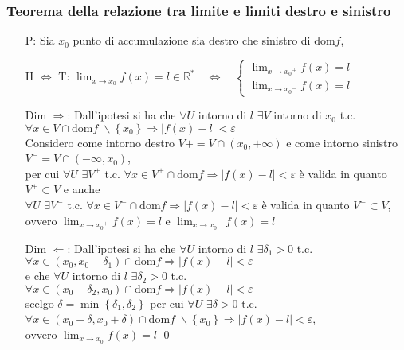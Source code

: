 \documentclass[a4paper]{article}
\newcommand\dom{\text{dom}}
\begin{document}
\subsubsection*{Teorema della relazione tra limite e limiti destro e sinistro}
\begin{itemize}
	\item[P:] Sia \(x_0\) punto di accumulazione sia destro che sinistro di \(\dom f\),
	\item[H \(\Leftrightarrow\) T:] \(\displaystyle \lim_{x \to x_0} f(x) = l \in \mathbb{R}^* \quad \Leftrightarrow \quad
	\begin{cases}
		\displaystyle \lim_{x \to {x_0}^+} f(x) = l \\
		\displaystyle \lim_{x \to {x_0}^-} f(x) = l
	\end{cases}
	\)

	\item[Dim \(\Rightarrow\):] Dall'ipotesi si ha che \(\forall U\) intorno di \(l\) \(\exists V\) intorno di \(x_0\) t.c. \(\forall x \in V \cap \dom f \; \backslash \left\{ x_0 \right\} \Rightarrow \left| f(x) - l \right| < \varepsilon\) \\
	Considero come intorno destro \(V+ = V \cap \left( x_0, + \infty \right) \) e come intorno sinistro \(V^- = V \cap \left( -\infty, x_0 \right)\), \\
	per cui \(\forall U\) \(\exists V^+\) t.c. \(\forall x \in V^+ \cap \dom f \Rightarrow \left| f(x) - l \right| < \varepsilon\) è valida in quanto \(V^+ \subset V\) e anche \\
	\(\forall U\) \(\exists V^-\) t.c. \(\forall x \in V^- \cap \dom f \Rightarrow \left| f(x) - l \right| < \varepsilon\) è valida in quanto \(V^- \subset V\), \\
	ovvero \(\displaystyle \lim_{x \to {x_0}^+} f(x) = l\) e \(\displaystyle \lim_{x \to {x_0}^-} f(x) = l\)
	
	\item[Dim \(\Leftarrow\):] Dall'ipotesi si ha che \(\forall U\) intorno di \(l\) \(\exists \delta_1 > 0\) t.c. \(\forall x \in \left( x_0, x_0 + \delta_1 \right) \cap \dom f \Rightarrow \left| f(x) - l \right| < \varepsilon\) \\
	e che \(\forall U\) intorno di \(l\) \(\exists \delta_2 > 0\) t.c. \(\forall x \in \left( x_0 - \delta_2, x_0 \right) \cap \dom f \Rightarrow \left| f(x) - l \right| < \varepsilon\) \\
	scelgo \(\delta = \min \left\{ \delta_1, \delta_2 \right\}\) per cui \(\forall U\) \(\exists \delta > 0\) t.c. \(\forall x \in \left( x_0 - \delta, x_0 + \delta \right) \cap \dom f \; \backslash \left\{ x_0 \right\} \Rightarrow \left| f(x) - l \right| < \varepsilon\), \\
	ovvero \(\displaystyle \lim_{x \to x_0} f(x) = l\) \qed
\end{itemize}
\end{document}
